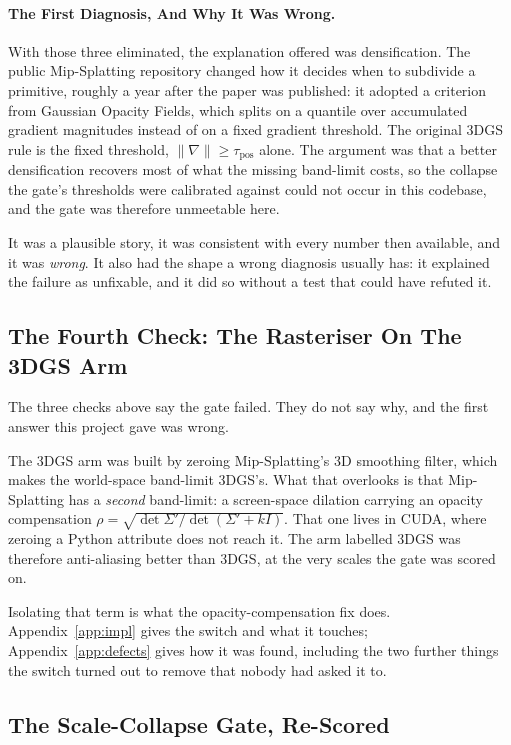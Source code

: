 \paragraph{The First Diagnosis, And Why It Was Wrong.} With those three
eliminated, the explanation offered was densification. The public Mip-Splatting repository
changed how it decides when to subdivide a primitive, roughly a year after the
paper was published: it adopted a criterion from Gaussian Opacity Fields, which
splits on a quantile over accumulated gradient magnitudes instead of on a fixed
gradient threshold. The original
3DGS rule is the fixed threshold, $\lVert\nabla\rVert \ge \tau_{\mathrm{pos}}$
alone. The argument was that a
better densification recovers most of what the missing band-limit costs, so the collapse the gate's thresholds were calibrated against could not occur in
this codebase, and the gate was therefore unmeetable here.

It was a plausible story, it was consistent with every number then available,
and it was \emph{wrong}. It also had the shape a wrong diagnosis usually has:
it explained the failure as unfixable, and it did so without a test that could
have refuted it.

\subsection*{The Fourth Check: The Rasteriser On The 3DGS Arm}
\label{sec:c1}

The three checks above say the gate failed. They do not say why, and the first
answer this project gave was wrong.

The 3DGS arm was built by zeroing Mip-Splatting's 3D smoothing filter, which makes the
world-space band-limit 3DGS's. What that overlooks is that Mip-Splatting has a
\emph{second} band-limit: a screen-space dilation carrying an opacity
compensation $\rho = \sqrt{\det\Sigma' / \det(\Sigma' + k I)}$. That one lives in
CUDA,
where zeroing a Python attribute does not reach it. The arm labelled 3DGS was therefore anti-aliasing better than 3DGS, at the very scales the gate was
scored on.

Isolating that term is what the opacity-compensation fix does. Appendix~\ref{app:impl} gives the switch and
what it touches; Appendix~\ref{app:defects} gives how it was found, including the
two further things the switch turned out to remove that nobody had asked it to.
\subsection*{The Scale-Collapse Gate, Re-Scored}

